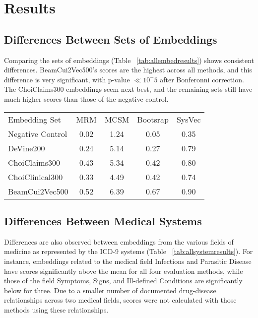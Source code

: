 \documentclass[11pt,a4paper]{article}
\begin{document}
\section{Results}


\subsection{Differences Between Sets of Embeddings}
Comparing the sets of embeddings (Table ~\ref{tab:allembedresults}) shows consistent differences. BeamCui2Vec500's scores are the highest across all methods, and this difference is very significant, with p-value $\ll 10^-5$ after Bonferonni correction. The ChoiClaims300 embeddings seem next best, and the remaining sets still have much higher scores than those of the negative control. 


\begin{table*}[h]
	\begin{center}
		\begin{tabular}{lcccc}
			Embedding Set &MRM 	        &MCSM              &Bootsrap 	  &SysVec \\
			\hlineB{4}
			Negative Control& 0.02 & 1.24 & 0.05 & 0.35 \\
			\hline	            
			DeVine200       & 0.24 & 5.14 &	0.27 & 0.79 \\
			\hline
			ChoiClaims300   & 0.43 & 5.34 &	0.42 & 0.80 \\
			\hline 
			ChoiClinical300	& 0.33 & 4.49 &	0.42 & 0.74 \\
			\hline
			BeamCui2Vec500	& 0.52 & 6.39 & 0.67 & 0.90 \\
		\end{tabular}
		\caption{Mean scores for embedding sets for each evaluation method. See Methods section for abbreviations}
		\label{tab:allembedresults}
	\end{center}
	
\end{table*}


\subsection{Differences Between Medical Systems}

Differences are also observed between embeddings from the various fields of medicine as represented by the ICD-9 systems (Table ~\ref{tab:allsystemresults}). For instance, embeddings related to the medical field Infections and Parasitic Disease have scores significantly above the mean for all four evaluation methods, while those of the field Symptoms, Signs, and Ill-defined Conditions are significantly below for three. Due to a smaller number of documented drug-disease relationships across two medical fields, scores were not calculated with those methods using these relationships.  
\end{document}
